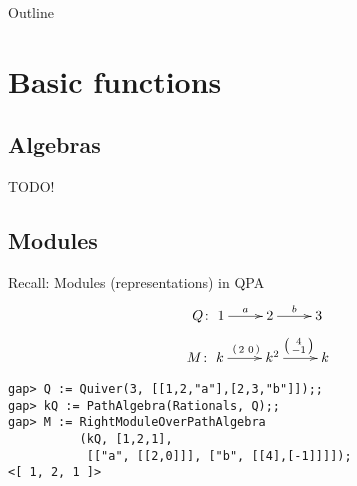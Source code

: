 \newcommand{\QPAIntroPartNumber}{2}




\begin{frame}
  \titlepage
\end{frame}

\begin{frame}{Outline}
  \tableofcontents
\end{frame}

\section{Basic functions}

\subsection{Algebras}

\begin{frame}
TODO!
\end{frame}

\subsection{Modules}

\begin{frame}[fragile]{Recall: Modules (representations) in QPA}
\[
Q \colon
\xymatrix{1 \ar[r]^a & 2 \ar[r]^b & 3}
\]
\[
M \colon
\xymatrix{
k   \ar[r]^{\left( \begin{smallmatrix} 2 & 0 \end{smallmatrix} \right)} &
k^2 \ar[r]^{\left( \begin{smallmatrix} 4 \\ -1 \end{smallmatrix} \right)} &
k
}
\]
\begin{verbatim}
gap> Q := Quiver(3, [[1,2,"a"],[2,3,"b"]]);;
gap> kQ := PathAlgebra(Rationals, Q);;
gap> M := RightModuleOverPathAlgebra
          (kQ, [1,2,1],
           [["a", [[2,0]]], ["b", [[4],[-1]]]]);
<[ 1, 2, 1 ]>
\end{verbatim}
\end{frame}


